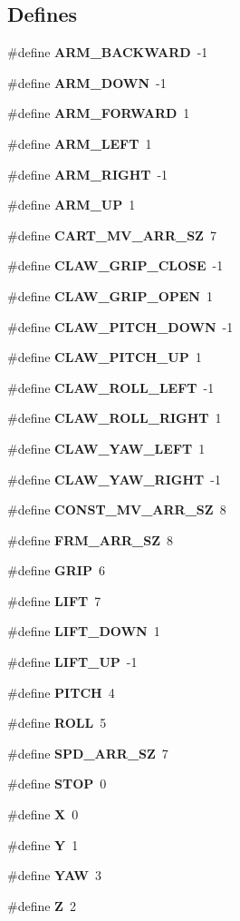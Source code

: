 \subsection*{\-Defines}
\begin{DoxyCompactItemize}
\item 
\#define {\bf \-A\-R\-M\-\_\-\-B\-A\-C\-K\-W\-A\-R\-D}~-\/1
\item 
\#define {\bf \-A\-R\-M\-\_\-\-D\-O\-W\-N}~-\/1
\item 
\#define {\bf \-A\-R\-M\-\_\-\-F\-O\-R\-W\-A\-R\-D}~1
\item 
\#define {\bf \-A\-R\-M\-\_\-\-L\-E\-F\-T}~1
\item 
\#define {\bf \-A\-R\-M\-\_\-\-R\-I\-G\-H\-T}~-\/1
\item 
\#define {\bf \-A\-R\-M\-\_\-\-U\-P}~1
\item 
\#define {\bf \-C\-A\-R\-T\-\_\-\-M\-V\-\_\-\-A\-R\-R\-\_\-\-S\-Z}~7
\item 
\#define {\bf \-C\-L\-A\-W\-\_\-\-G\-R\-I\-P\-\_\-\-C\-L\-O\-S\-E}~-\/1
\item 
\#define {\bf \-C\-L\-A\-W\-\_\-\-G\-R\-I\-P\-\_\-\-O\-P\-E\-N}~1
\item 
\#define {\bf \-C\-L\-A\-W\-\_\-\-P\-I\-T\-C\-H\-\_\-\-D\-O\-W\-N}~-\/1
\item 
\#define {\bf \-C\-L\-A\-W\-\_\-\-P\-I\-T\-C\-H\-\_\-\-U\-P}~1
\item 
\#define {\bf \-C\-L\-A\-W\-\_\-\-R\-O\-L\-L\-\_\-\-L\-E\-F\-T}~-\/1
\item 
\#define {\bf \-C\-L\-A\-W\-\_\-\-R\-O\-L\-L\-\_\-\-R\-I\-G\-H\-T}~1
\item 
\#define {\bf \-C\-L\-A\-W\-\_\-\-Y\-A\-W\-\_\-\-L\-E\-F\-T}~1
\item 
\#define {\bf \-C\-L\-A\-W\-\_\-\-Y\-A\-W\-\_\-\-R\-I\-G\-H\-T}~-\/1
\item 
\#define {\bf \-C\-O\-N\-S\-T\-\_\-\-M\-V\-\_\-\-A\-R\-R\-\_\-\-S\-Z}~8
\item 
\#define {\bf \-F\-R\-M\-\_\-\-A\-R\-R\-\_\-\-S\-Z}~8
\item 
\#define {\bf \-G\-R\-I\-P}~6
\item 
\#define {\bf \-L\-I\-F\-T}~7
\item 
\#define {\bf \-L\-I\-F\-T\-\_\-\-D\-O\-W\-N}~1
\item 
\#define {\bf \-L\-I\-F\-T\-\_\-\-U\-P}~-\/1
\item 
\#define {\bf \-P\-I\-T\-C\-H}~4
\item 
\#define {\bf \-R\-O\-L\-L}~5
\item 
\#define {\bf \-S\-P\-D\-\_\-\-A\-R\-R\-\_\-\-S\-Z}~7
\item 
\#define {\bf \-S\-T\-O\-P}~0
\item 
\#define {\bf \-X}~0
\item 
\#define {\bf \-Y}~1
\item 
\#define {\bf \-Y\-A\-W}~3
\item 
\#define {\bf \-Z}~2
\end{DoxyCompactItemize}
